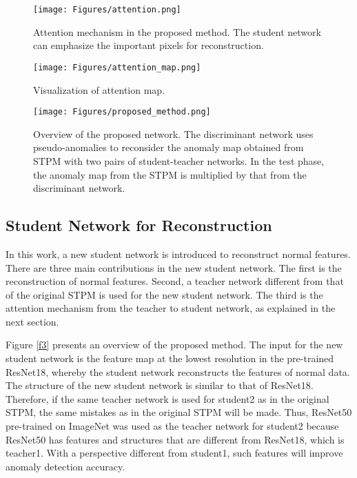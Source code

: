 \documentclass[letterpaper, 10 pt, conference]{ieeeconf}
\begin{document}
\begin{figure}[t]
\begin{center}
\vspace{0.2cm}
\texttt{[image: Figures/attention.png]}
\end{center}
\caption{Attention mechanism in the proposed method. 
The student network can emphasize the important pixels for reconstruction.}
\label{f4}
\end{figure}

\begin{figure}[t]
\begin{center}
\texttt{[image: Figures/attention\_map.png]}
\end{center}
\caption{Visualization of attention map. }
\label{f5}
\end{figure}


\begin{figure*}[t]
\begin{center}
\vspace{0.2cm}
\texttt{[image: Figures/proposed\_method.png]}
\end{center}
\caption{Overview of the proposed network. The discriminant network uses pseudo-anomalies to reconsider the anomaly map obtained from STPM with two pairs of student-teacher networks. In the test phase, the anomaly map from the STPM is multiplied by that from the discriminant network.}
\label{f6}
\end{figure*}

 
\subsection{Student Network for Reconstruction} 

In this work, a new student network is introduced to reconstruct normal features. There are three main contributions in the new student network. The first is the reconstruction of normal features. Second, a teacher network different from that of the original STPM is used for the new student network. The third is the attention mechanism from the teacher to student network, as explained in the next section. 

Figure \ref{f3} presents an overview of the proposed method. The input for the new student network is the feature map at the lowest resolution in the pre-trained ResNet18, whereby the student network reconstructs the features of normal data. The structure of the new student network is similar to that of ResNet18. Therefore, if the same teacher network is used for student2 as in the original STPM, the same mistakes as in the original STPM will be made. Thus, ResNet50 pre-trained on ImageNet was used as the teacher network for student2 because ResNet50 has features and structures that are different from ResNet18, which is teacher1. With a perspective different from student1, such features will improve anomaly detection accuracy. 
\end{document}
